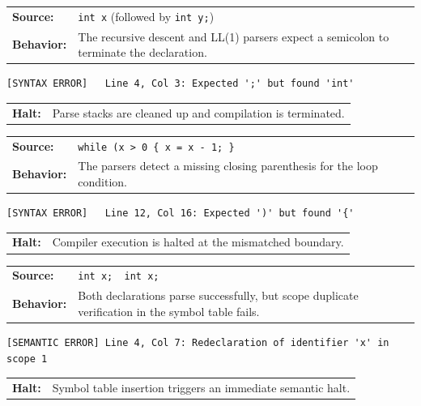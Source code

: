 \documentclass[11pt,a4paper]{article}
\begin{document}
\bigskip
\begin{tcolorbox}[testcase, title={Test Case 2 \quad|\quad Syntactic Error — Missing Semicolon}]
\begin{tabular}{@{}L{2.4cm}L{11cm}@{}}
\textbf{Source:}   & \texttt{int x} (followed by \texttt{int y;}) \\[4pt]
\textbf{Behavior:} & The recursive descent and LL(1) parsers expect a semicolon to terminate the declaration. \\
\end{tabular}
\medskip
\begin{lstlisting}[style=outputstyle, numbers=none]
[SYNTAX ERROR]   Line 4, Col 3: Expected ';' but found 'int'
\end{lstlisting}
\smallskip
\begin{tabular}{@{}L{2.4cm}L{11cm}@{}}
\textbf{Halt:} & Parse stacks are cleaned up and compilation is terminated.
\end{tabular}
\end{tcolorbox}

\bigskip
\begin{tcolorbox}[testcase, title={Test Case 3 \quad|\quad Syntactic Error — Mismatched Parenthesis}]
\begin{tabular}{@{}L{2.4cm}L{11cm}@{}}
\textbf{Source:}   & \texttt{while (x > 0 \{ x = x - 1; \}} \\[4pt]
\textbf{Behavior:} & The parsers detect a missing closing parenthesis for the loop condition. \\
\end{tabular}
\medskip
\begin{lstlisting}[style=outputstyle, numbers=none]
[SYNTAX ERROR]   Line 12, Col 16: Expected ')' but found '{'
\end{lstlisting}
\smallskip
\begin{tabular}{@{}L{2.4cm}L{11cm}@{}}
\textbf{Halt:} & Compiler execution is halted at the mismatched boundary.
\end{tabular}
\end{tcolorbox}

\bigskip
\begin{tcolorbox}[testcase, title={Test Case 4 \quad|\quad Semantic Error — Duplicate Variable Declaration}]
\begin{tabular}{@{}L{2.4cm}L{11cm}@{}}
\textbf{Source:}   & \texttt{int x;\ \ int x;} \\[4pt]
\textbf{Behavior:} & Both declarations parse successfully, but scope duplicate verification in the symbol table fails. \\
\end{tabular}
\medskip
\begin{lstlisting}[style=outputstyle, numbers=none]
[SEMANTIC ERROR] Line 4, Col 7: Redeclaration of identifier 'x' in scope 1
\end{lstlisting}
\smallskip
\begin{tabular}{@{}L{2.4cm}L{11cm}@{}}
\textbf{Halt:} & Symbol table insertion triggers an immediate semantic halt.
\end{tabular}
\end{tcolorbox}
\end{document}
